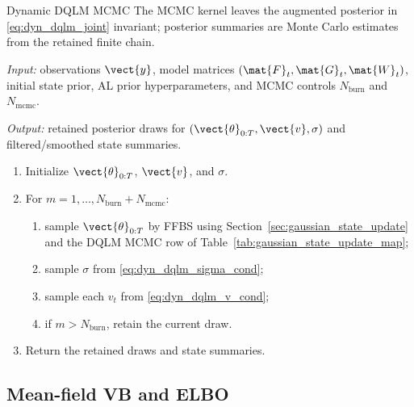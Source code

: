\begin{suppalgorithm}{Dynamic DQLM MCMC}
\label{alg:dyn-dqlm-mcmc}
The MCMC kernel leaves the augmented posterior in
\eqref{eq:dyn_dqlm_joint} invariant; posterior summaries are Monte Carlo
estimates from the retained finite chain.
\par\noindent\emph{Input:} observations $\vect{y}$, model matrices
$(\mat{F}_t,\mat{G}_t,\mat{W}_t)$, initial state prior, AL prior
hyperparameters, and MCMC controls $N_{\mathrm{burn}}$ and
$N_{\mathrm{mcmc}}$.
\par\noindent\emph{Output:} retained posterior draws for
$(\vect{\theta}_{0:T},\vect{v},\sigma)$ and filtered/smoothed state summaries.
\begin{enumerate}[label=(\arabic*)]
\item Initialize $\vect{\theta}_{0:T}$, $\vect{v}$, and $\sigma$.
\item For $m=1,\ldots,N_{\mathrm{burn}}+N_{\mathrm{mcmc}}$:
  \begin{enumerate}[label=(\alph*)]
  \item sample $\vect{\theta}_{0:T}$ by FFBS using
  Section~\ref{sec:gaussian_state_update} and the DQLM MCMC row of
  Table~\ref{tab:gaussian_state_update_map};
  \item sample $\sigma$ from \eqref{eq:dyn_dqlm_sigma_cond};
  \item sample each $v_t$ from \eqref{eq:dyn_dqlm_v_cond};
  \item if $m>N_{\mathrm{burn}}$, retain the current draw.
  \end{enumerate}
\item Return the retained draws and state summaries.
\end{enumerate}
\end{suppalgorithm}

\subsection{Mean-field VB and ELBO}

